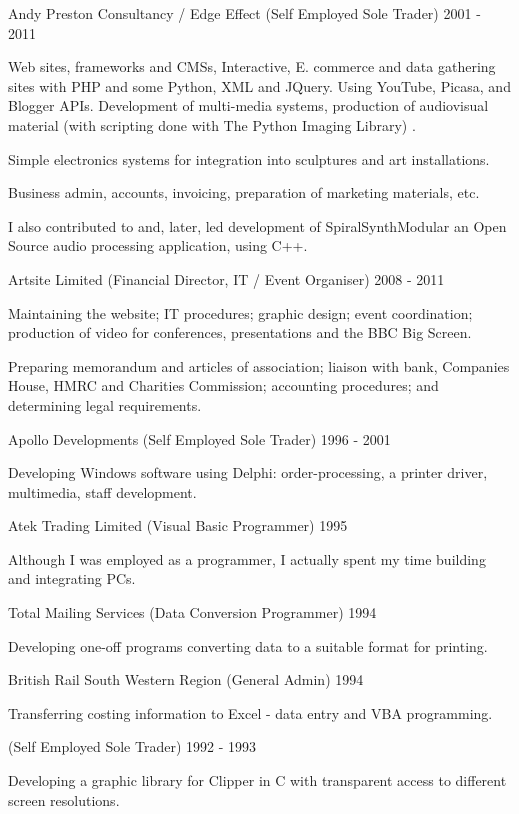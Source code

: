 \jobHeading
    {Andy Preston Consultancy / Edge Effect (Self Employed Sole Trader)}
    {2001 - 2011}

Web sites, frameworks and CMSs, Interactive, E. commerce and
data gathering sites with PHP and some Python, XML and JQuery.
Using YouTube, Picasa, and Blogger APIs.
Development of multi-media systems, production of audiovisual
material\ifnum{}
    (with scripting done with The Python Imaging Library)
\fi.

Simple electronics systems for integration into
sculptures and art installations.

Business admin, accounts, invoicing, preparation of
marketing materials, etc.

I also contributed to and, later, led development
of SpiralSynthModular an Open Source audio processing application,
using C++.

\jobHeading
    {Artsite Limited (Financial Director, IT / Event Organiser)}
    {2008 - 2011}

Maintaining the website; IT procedures; graphic design; event coordination;
production of video for conferences, presentations and the BBC Big Screen.

Preparing memorandum and articles of association;
liaison with bank, Companies House, HMRC and Charities Commission;
accounting procedures; and determining legal requirements.

\jobHeading
    {Apollo Developments (Self Employed Sole Trader)}
    {1996 - 2001}

Developing Windows software using Delphi:
order-processing, a printer driver, multimedia, staff development.

\jobHeading
    {Atek Trading Limited (Visual Basic Programmer)}
    {1995}

Although I was employed as a programmer,
I actually spent my time building and integrating PCs.

\jobHeading
    {Total Mailing Services (Data Conversion Programmer)}
    {1994}

Developing one-off programs converting data to a suitable format for printing.

\jobHeading
    {British Rail South Western Region (General Admin)}
    {1994}

Transferring costing information to Excel - data entry and VBA programming.

\jobHeading
    {(Self Employed Sole Trader)}
    {1992 - 1993}

Developing a graphic library for Clipper in C
with transparent access to different screen resolutions.

